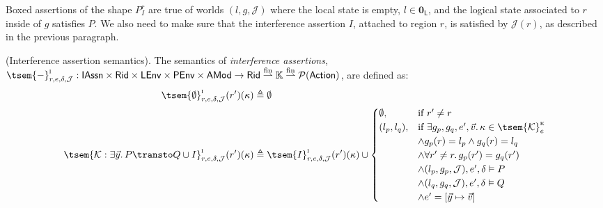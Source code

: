 Boxed assertions of the shape $\boxed{P}^r_I$ are true of worlds $(l, g, \mathcal{J})$ where the local state is empty, $l \in \mathbf{0}_\mathsf{L}$, and the logical state associated to $r$ inside of $g$ satisfies $P$. We also need to make sure that the interference assertion $I$, attached to region $r$, is satisfied by $\mathcal{J}(r)$, as described in the previous paragraph.

\begin{defn}
	\label{defn:interferenceSem}
	(Interference assertion semantics).
	The semantics of \emph{interference assertions}, $\tsem{-}^\textsc{i}_{r, e, \delta, \mathcal{J}} : \mathsf{IAssn} \times \mathsf{Rid} \times \mathsf{LEnv} \times \mathsf{PEnv} \times \mathsf{AMod} \rightarrow \mathsf{Rid} \overset{\text{fin}}{\rightharpoonup} \mathbb{K} \overset{\text{fin}}{\rightharpoonup} \mathcal{P}(\mathsf{Action})$, are defined as:
	\begin{align*}
		\tsem{\emptyset}^\textsc{i}_{r, e, \delta, \mathcal{J}}(r')(\kappa) &\triangleq \emptyset
		\\
		\tsem{\mathcal{K}: \exists \vec{y} \ldotp P \transto Q \cup I}^\textsc{i}_{r, e, \delta, \mathcal{J}}(r')(\kappa) &\triangleq
			\tsem{I}^\textsc{i}_{r, e, \delta, \mathcal{J}}(r')(\kappa)
			\cup 
			\begin{cases}
				\emptyset, & \text{if } r' \neq r
				\\
				(l_p, l_q), & \text{if } \exists g_p, g_q, e', \vec{v} \ldotp
				\kappa \in \tsem{\mathcal{K}}^\textsc{k}_e
				\\
				& \land g_p(r) = l_p \land g_q(r) = l_q
				\\
				& \land \forall r' \neq r \ldotp g_p(r') = g_q(r')
				\\
				& \land (l_p, g_p, \mathcal{J}), e', \delta \vDash P
				\\
				& \land (l_q, g_q, \mathcal{J}), e', \delta \vDash Q
				\\
				& \land e' = [\vec{y} \mapsto \vec{v}] 
			\end{cases}
	\end{align*}
\end{defn}

